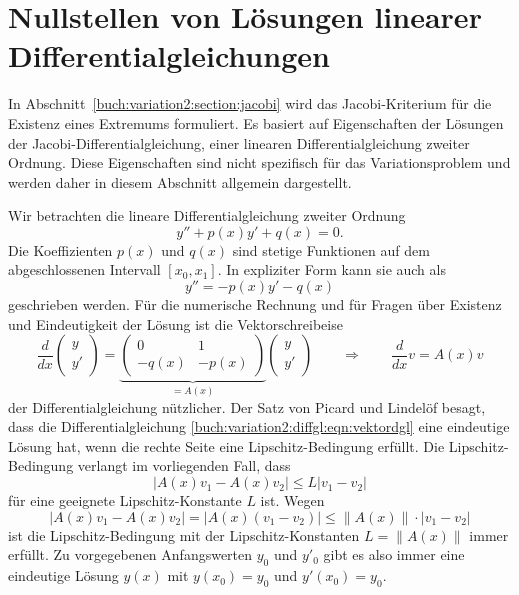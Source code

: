 %
%
%
\section{Nullstellen von Lösungen linearer Differentialgleichungen
\label{buch:variation2:section:diffgl}}
In Abschnitt~\ref{buch:variation2:section:jacobi} wird das
Jacobi-Kriterium für die Existenz eines Extremums formuliert.
Es basiert auf Eigenschaften der Lösungen der Jacobi-Differentialgleichung,
einer linearen Differentialgleichung zweiter Ordnung.
Diese Eigenschaften sind nicht spezifisch für das Variationsproblem
und werden daher in diesem Abschnitt allgemein dargestellt.

Wir betrachten die lineare Differentialgleichung zweiter Ordnung
\begin{equation}
y'' + p(x) y' + q(x) = 0.
\label{buch:variation2:diffgl:eqn:dgl}
\end{equation}
Die Koeffizienten $p(x)$ und $q(x)$ sind stetige Funktionen auf dem
abgeschlossenen Intervall $[x_0,x_1]$.
In expliziter Form kann sie auch als
\begin{equation}
y'' = - p(x) y' - q(x)
\label{buch:variation2:diffgl:eqn:explizit}
\end{equation}
geschrieben werden.
Für die numerische Rechnung und für Fragen über Existenz und Eindeutigkeit
der Lösung ist die Vektorschreibeise
\begin{equation}
\frac{d}{dx}
\begin{pmatrix} y\\ y' \end{pmatrix}
=
\underbrace{
\begin{pmatrix}
    0&    1\\
-q(x)&-p(x)
\end{pmatrix}
}_{\displaystyle =A(x)}
\begin{pmatrix} y\\ y' \end{pmatrix}
\qquad\Rightarrow\qquad
\frac{d}{dx}v = A(x) v
\label{buch:variation2:diffgl:eqn:vektordgl}
\end{equation}
der Differentialgleichung nützlicher.
Der Satz von Picard und Lindelöf besagt, dass die Differentialgleichung
\eqref{buch:variation2:diffgl:eqn:vektordgl} eine eindeutige
Lösung hat, wenn die rechte Seite eine Lip\-schitz-Bedingung
erfüllt.
Die Lipschitz-Bedingung verlangt im vorliegenden Fall, dass
\[
|A(x)v_1 - A(x)v_2|
\le
L |v_1-v_2|
\]
für eine geeignete Lipschitz-Konstante $L$ ist.
Wegen
\[
|A(x)v_1-A(x)v_2|
=
|A(x)(v_1-v_2)|
\le
\|A(x)\|\cdot |v_1-v_2|
\]
ist die Lipschitz-Bedingung mit der Lipschitz-Konstanten
$L=\|A(x)\|$ immer erfüllt.
Zu vorgegebenen Anfangswerten $y_0$ und $y'_0$ gibt es also
immer eine eindeutige Lösung $y(x)$ mit $y(x_0)=y_0$ und
$y'(x_0)=y_0$.

